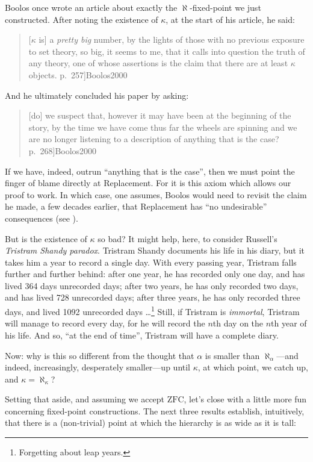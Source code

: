 \documentclass[10pt,a4paper]{article}
\makeatletter
\theoremstyle{plain}
\theoremstyle{definition}
\theoremstyle{remark}
\newcommand{\olref}{\@ifnextchar[{\olref@i}{\olref@final}}
\def\olref@i[#1]{\@ifnextchar[{\olref@ii}{\olref@final}}
\def\olref@ii[#1]{\@ifnextchar[{\olref@iii}{\olref@final}}
\def\olref@iii[#1]{\olref@final}
\def\olref@final#1{\ref{#1}}
\providecommand{\ZFC}{\mathrm{ZFC}}
\providecommand{\citep}[1]{\cite{#1}}
\makeatother
\begin{document}
Boolos once wrote an article about exactly the $\aleph$-fixed-point we
just constructed. After noting the existence of $\kappa$, at the start
of his article, he said:
\begin{quote}
	[$\kappa$ is] a \emph{pretty big} number, by the lights of those
	with no previous exposure to  set theory,  so big, it seems to me,
	that  it calls into question the truth of any theory, one of whose
	assertions is the claim that there are at least $\kappa$ objects.
	\citep[p.~257]{Boolos2000}
\end{quote}
And he ultimately concluded his paper by asking:
\begin{quote}
	[do] we  suspect that,  however  it  may  have  been  at  the
	beginning  of  the  story,  by  the  time  we have come thus  far
	the wheels  are  spinning  and  we  are no longer  listening  to
	a description  of  anything  that  is the case?
	\citep[p.~268]{Boolos2000}
\end{quote}
If we have, indeed, outrun ``anything that is the case'', then we must
point the finger of blame directly at Replacement. For it is this
axiom which allows our proof to work. In which case, one assumes,
Boolos would need to revisit the claim he made, a few decades earlier,
that Replacement has ``no undesirable'' consequences (see
\olref[replacement][extrinsic]{sec}).

But is the existence of $\kappa$ so bad? It might help, here, to
consider Russell's \emph{Tristram Shandy paradox}. Tristram Shandy
documents his life in his diary, but it takes him a year to record a
single day. With every passing year, Tristram falls further and
further behind: after one year, he has recorded only one day, and has
lived 364 days unrecorded days; after two years, he has only recorded
two days, and has lived 728 unrecorded days; after three years, he has
only recorded three days, and lived 1092 unrecorded
days \dots\footnote{Forgetting about leap years.} Still, if Tristram
is \emph{immortal}, Tristram will manage to record every day, for he
will record the $n$th day on the $n$th year of his life. And so, ``at
the end of time'', Tristram will have a complete diary. 

Now: why is this so different from the thought that $\alpha$ is
smaller than $\aleph_\alpha$---and indeed, increasingly, desperately
smaller---up until $\kappa$, at which point, we catch up, and $\kappa
= \aleph_\kappa$?

Setting that aside, and assuming we accept $\ZFC$, let's close with a
little more fun concerning fixed-point constructions. The next three
results establish, intuitively, that there is a (non-trivial) point at
which the hierarchy is as wide as it is tall:
\end{document}
